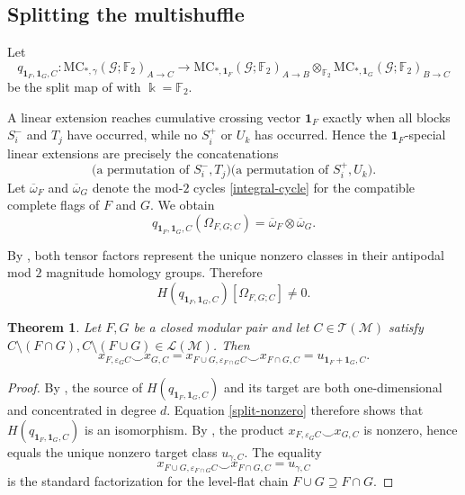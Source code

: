 \documentclass[10pt]{amsart}
\theoremstyle{plain}
\newtheorem{theorem}{Theorem}[section]
\theoremstyle{definition}
\newcommand{\one}{\mathbf{1}}
\newcommand{\T}{\mathcal{T}}
\newcommand{\G}{\mathcal{G}}
\newcommand{\MC}{\mathrm{MC}}
\newcommand{\M}{\mathcal{M}}
\newcommand{\Lcov}{\mathcal{L}}
\newcommand{\eps}{\varepsilon}
\newcommand{\Ftwo}{\mathbb F_2}
\newcommand{\kk}{\Bbbk}
\begin{document}
\subsection{Splitting the multishuffle}

Let
\[
q_{\one_F,\one_G,C}:\MC_{*,\gamma}(\G;\Ftwo)_{A\to C}\to\MC_{*,\one_F}(\G;\Ftwo)_{A\to B}\otimes_{\Ftwo}\MC_{*,\one_G}(\G;\Ftwo)_{B\to C}
\]
be the split map of  with $\kk=\Ftwo$.

A linear extension reaches cumulative crossing vector $\one_F$ exactly when all blocks $S_i^-$ and $T_j$ have occurred, while no $S_i^+$ or $U_k$ has occurred. Hence the $\one_F$-special linear extensions are precisely the concatenations
\[
\bigl(\text{a permutation of }S_i^-,T_j\bigr)\bigl(\text{a permutation of }S_i^+,U_k\bigr).
\]
Let $\overline{\omega}_F$ and $\overline{\omega}_G$ denote the mod-$2$ cycles \eqref{integral-cycle} for the compatible complete flags of $F$ and $G$.  We obtain
\[
q_{\one_F,\one_G,C}(\Omega_{F,G;C})=\overline{\omega}_F\otimes\overline{\omega}_G.
\]

By , both tensor factors represent the unique nonzero classes in their antipodal mod $2$ magnitude homology groups. Therefore
\begin{equation}\label{split-nonzero}
H(q_{\one_F,\one_G,C})[\Omega_{F,G;C}]\neq0.
\end{equation}

\begin{theorem}\label{local-modular-thm}
Let $F,G$ be a closed modular pair and let $C\in\T(\M)$ satisfy $C\setminus (F\cap G),C\setminus (F\cup G)\in\Lcov(\M)$. Then
\[
x_{F,\eps_G C}\smile x_{G,C}=x_{F\cup G,\eps_{F\cap G}C}\smile x_{F\cap G,C}=u_{\one_F+\one_G,C}.
\]
\end{theorem}

\begin{proof}
By , the source of $H(q_{\one_F,\one_G,C})$ and its target are both one-dimensional and concentrated in degree $d$. Equation \eqref{split-nonzero} therefore shows that $H(q_{\one_F,\one_G,C})$ is an isomorphism. By , the product $x_{F,\eps_G C}\smile x_{G,C}$ is nonzero, hence equals the unique nonzero target class $u_{\gamma,C}$. The equality
\[
x_{F\cup G,\eps_{F\cap G}C}\smile x_{F\cap G,C}=u_{\gamma,C}
\]
is the standard factorization  for the level-flat chain $F\cup G\supseteq F\cap G$.
\end{proof}
\end{document}

